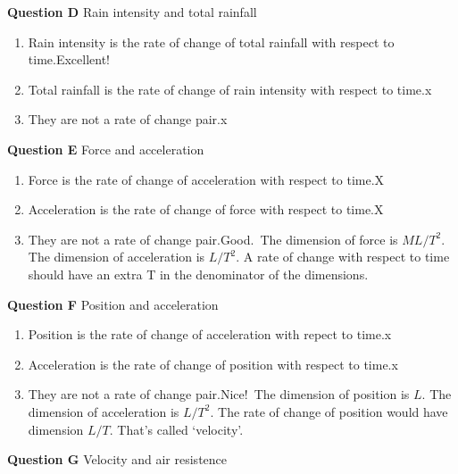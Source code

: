 \documentclass[
  letterpaper,
  DIV=11,
  numbers=noendperiod,
  oneside]{article}
\providecommand{\tightlist}{%
  \setlength{\itemsep}{0pt}\setlength{\parskip}{0pt}}\usepackage{longtable,booktabs,array}
\begin{document}
\begin{multicols}{2}
\textbf{Question D} Rain intensity and total rainfall

\begin{enumerate}
\def\labelenumi{\roman{enumi}.}
\tightlist
\item
  {Rain intensity is the rate of change of total rainfall with respect
  to time.{Excellent!~}}\\
\item
  {Total rainfall is the rate of change of rain intensity with respect
  to time.{x}}\\
\item
  {They are not a rate of change pair.{x}}
\end{enumerate}

\textbf{Question E} Force and acceleration

\begin{enumerate}
\def\labelenumi{\roman{enumi}.}
\tightlist
\item
  {Force is the rate of change of acceleration with respect to time.{︎X
  }}\\
\item
  {Acceleration is the rate of change of force with respect to time.{︎X
  }}\\
\item
  {They are not a rate of change pair.{Good.~The dimension of force is
  \(ML/T^2\). The dimension of acceleration is \(L/T^2\). A rate of
  change with respect to time should have an extra T in the denominator
  of the dimensions.}}
\end{enumerate}

\textbf{Question F} Position and acceleration

\begin{enumerate}
\def\labelenumi{\roman{enumi}.}
\tightlist
\item
  {Position is the rate of change of acceleration with repect to
  time.{x}}\\
\item
  {Acceleration is the rate of change of position with respect to
  time.{x}}\\
\item
  {They are not a rate of change pair.{Nice!~The dimension of position
  is \(L\). The dimension of acceleration is \(L/T^2\). The rate of
  change of position would have dimension \(L/T\). That's called
  `velocity'.}}
\end{enumerate}

\textbf{Question G} Velocity and air resistence


\end{multicols}
\end{document}
